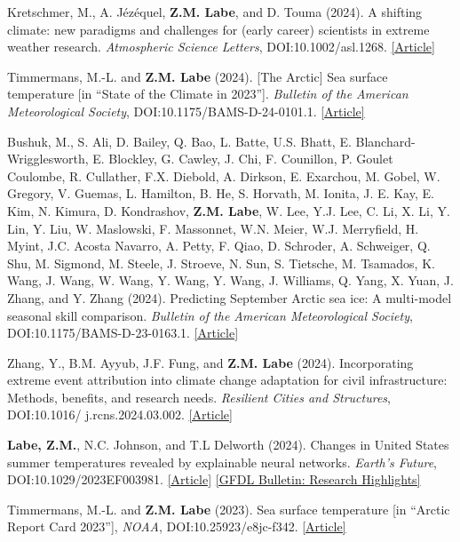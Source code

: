 \documentclass[margin,line,palatino,courier,10pt]{res}
\begin{document}
\begin{resume}
\begin{etaremune}[leftmargin=0in,topsep=0in,parsep=0in]
\item Kretschmer, M., A. J\'{e}z\'{e}quel, \textbf{Z.M. Labe}, and D. Touma (2024). A shifting climate: new paradigms and challenges for (early career) scientists in extreme weather research. \textit{Atmospheric Science Letters}, DOI:10.1002/asl.1268. \href{https://doi.org/10.1002/asl.1268}{[Article]}
\item Timmermans, M.-L. and \textbf{Z.M. Labe} (2024). [The Arctic] Sea surface temperature [in ``State of the Climate in 2023'']. \textit{Bulletin of the American Meteorological Society}, DOI:10.1175/BAMS-D-24-0101.1. \href{https://doi.org/10.1175/BAMS-D-24-0101.1}{[Article]}
\item Bushuk, M., S. Ali, D. Bailey, Q. Bao, L. Batte, U.S. Bhatt, E. Blanchard-Wrigglesworth, E. Blockley, G. Cawley, J. Chi, F. Counillon, P. Goulet Coulombe, R. Cullather, F.X. Diebold, A. Dirkson, E. Exarchou, M. Gobel, W. Gregory, V. Guemas, L. Hamilton, B. He, S. Horvath, M. Ionita, J. E. Kay, E. Kim, N. Kimura, D. Kondrashov, \textbf{Z.M. Labe}, W. Lee, Y.J. Lee, C. Li, X. Li, Y. Lin, Y. Liu, W. Maslowski, F. Massonnet, W.N. Meier, W.J. Merryfield, H. Myint, J.C. Acosta Navarro, A. Petty, F. Qiao, D. Schroder, A. Schweiger, Q. Shu, M. Sigmond, M. Steele, J. Stroeve, N. Sun, S. Tietsche, M. Tsamados, K. Wang, J. Wang, W. Wang, Y. Wang, Y. Wang, J. Williams, Q. Yang, X. Yuan, J. Zhang, and Y. Zhang (2024). Predicting September Arctic sea ice: A multi-model seasonal skill comparison. \textit{Bulletin of the American Meteorological Society}, DOI:10.1175/BAMS-D-23-0163.1. \href{https://journals.ametsoc.org/view/journals/bams/aop/BAMS-D-23-0163.1/BAMS-D-23-0163.1.xml}{[Article]}
\item Zhang, Y., B.M. Ayyub, J.F. Fung, and \textbf{Z.M. Labe} (2024). Incorporating extreme event attribution into climate change adaptation for civil infrastructure: Methods, benefits, and research needs. \textit{Resilient Cities and Structures}, DOI:10.1016/ j.rcns.2024.03.002. \href{https://www.sciencedirect.com/science/article/pii/S277274162400005X}{[Article]}
\item \textbf{Labe, Z.M.}, N.C. Johnson, and T.L Delworth (2024). Changes in United States summer temperatures revealed by explainable neural networks. \textit{Earth's Future}, DOI:10.1029/2023EF003981. \href{https://agupubs.onlinelibrary.wiley.com/doi/10.1029/2023EF003981}{[Article]} \href{https://www.gfdl.noaa.gov/wp-content/uploads/2024/08/GFDL_Spring_Summer_2024_Bulletin.pdf}{[GFDL Bulletin: Research Highlights]}
\item Timmermans, M.-L. and \textbf{Z.M. Labe} (2023). Sea surface temperature [in ``Arctic Report Card 2023''], \textit{NOAA}, DOI:10.25923/e8jc-f342. \href{https://arctic.noaa.gov/report-card/report-card-2023/sea-surface-temperature-2023/}{[Article]}

\end{etaremune}
\end{resume}
\end{document}
